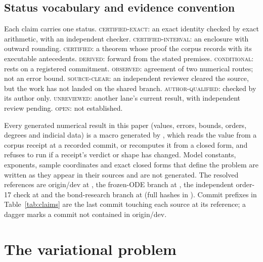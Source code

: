 \documentclass[aps,prd,onecolumn,amsmath,amssymb,longbibliography,floatfix,nofootinbib]{revtex4-2}
\newcommand{\st}[1]{\textsc{#1}}
\begin{document}
\subsection{Status vocabulary and evidence convention}
Each claim carries one status. \st{certified-exact}: an exact identity checked by exact arithmetic, with an independent checker. \st{certified-interval}: an enclosure with outward rounding. \st{certified}: a theorem whose proof the corpus records with its executable antecedents. \st{derived}: forward from the stated premises. \st{conditional}: rests on a registered commitment. \st{observed}: agreement of two numerical routes; not an error bound. \st{source-clear}: an independent reviewer cleared the source, but the work has not landed on the shared branch. \st{author-qualified}: checked by its author only. \st{unreviewed}: another lane's current result, with independent review pending. \st{open}: not established.

Every generated numerical result in this paper (values, errors, bounds, orders, degrees and indicial data) is a macro generated by , which reads the value from a corpus receipt at a recorded commit, or recomputes it from a closed form, and refuses to run if a receipt's verdict or shape has changed. Model constants, exponents, sample coordinates and exact closed forms that define the problem are written as they appear in their sources and are not generated. The resolved references are origin/dev at \RefDev, the frozen-ODE branch at \RefOde, the independent order-17 check at \RefCTwoSeven{} and the bond-research branch at \RefBond{} (full hashes in ). Commit prefixes in Table~\ref{tab:claims} are the last commit touching each source at its reference; a dagger marks a commit not contained in origin/dev.

\section{The variational problem}
\end{document}
